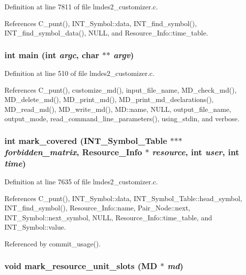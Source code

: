 Definition at line 7811 of file lmdes2\_\-customizer.c.

References C\_\-punt(), INT\_\-Symbol::data, INT\_\-find\_\-symbol(), INT\_\-find\_\-symbol\_\-data(), NULL, and Resource\_\-Info::time\_\-table.
\subsubsection{\setlength{\rightskip}{0pt plus 5cm}int main (int {\em argc}, char $\ast$$\ast$ {\em argv})}\label{lmdes2__customizer_8c_3c04138a5bfe5d72780bb7e82a18e627}




Definition at line 510 of file lmdes2\_\-customizer.c.

References C\_\-punt(), customize\_\-md(), input\_\-file\_\-name, MD\_\-check\_\-md(), MD\_\-delete\_\-md(), MD\_\-print\_\-md(), MD\_\-print\_\-md\_\-declarations(), MD\_\-read\_\-md(), MD\_\-write\_\-md(), MD::name, NULL, output\_\-file\_\-name, output\_\-mode, read\_\-command\_\-line\_\-parameters(), using\_\-stdin, and verbose.
\subsubsection{\setlength{\rightskip}{0pt plus 5cm}int mark\_\-covered (\bf{INT\_\-Symbol\_\-Table} $\ast$$\ast$$\ast$ {\em forbidden\_\-matrix}, \bf{Resource\_\-Info} $\ast$ {\em resource}, int {\em user}, int {\em time})}\label{lmdes2__customizer_8c_9f86fef88cfa05bb7b44606ba6d92f8b}




Definition at line 7635 of file lmdes2\_\-customizer.c.

References C\_\-punt(), INT\_\-Symbol::data, INT\_\-Symbol\_\-Table::head\_\-symbol, INT\_\-find\_\-symbol(), Resource\_\-Info::name, Pair\_\-Node::next, INT\_\-Symbol::next\_\-symbol, NULL, Resource\_\-Info::time\_\-table, and INT\_\-Symbol::value.

Referenced by commit\_\-usage().
\subsubsection{\setlength{\rightskip}{0pt plus 5cm}void mark\_\-resource\_\-unit\_\-slots (\bf{MD} $\ast$ {\em md})}\label{lmdes2__customizer_8c_5654a965175dc1d0b0e5b172cead0ac7}




